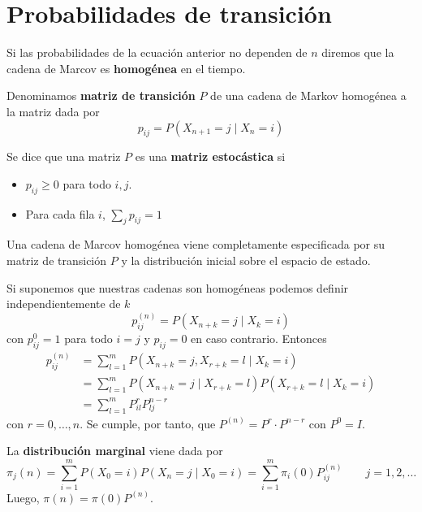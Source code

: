 \documentclass[PREyA.tex]{subfiles}
\begin{document}
\section{Probabilidades de transición}
\begin{defi}
Si las probabilidades de la ecuación anterior no dependen de $n$ diremos que la cadena de Marcov es \textbf{homogénea} en el tiempo.
\end{defi}
\begin{defi}
Denominamos \textbf{matriz de transición} $P$ de una cadena de Markov homogénea a la matriz dada por
$$
p_{ij} = P(X_{n+1}=j\mid X_{n}=i) 
$$
\end{defi}
\begin{defi}
Se dice que una matriz $P$ es una \textbf{matriz estocástica} si
	
	\begin{itemize}
		\item $p_{ij} \geq 0$ para todo $i,j$.
		\item Para cada fila $i$, $\sum_{j} p_{ij} =1$
	\end{itemize}
	
\end{defi}
\begin{prop}
Una cadena de Marcov homogénea viene completamente especificada por su matriz de transición $P$ y la distribución inicial sobre el espacio de estado.
\end{prop}
\begin{nota}
Si suponemos que nuestras cadenas son homogéneas podemos definir independientemente de $k$
$$p_{ij}^{(n)} = P(X_{n+k}=j\mid X_{k}=i)$$
 con $p_{ij}^{0}=1$ para todo $i = j$ y $p_{ij}=0$ en caso contrario. Entonces
\begin{align*}
p_{ij}^{(n)} &= \sum_{l=1}^{m}P(X_{n+k}=j, X_{r+k}=l\mid X_{k}=i)\\
&= \sum_{l=1}^{m} P(X_{n+k}=j\mid X_{r+k}=l)P(X_{r+k}=l\mid X_{k}=i)\\
&= \sum_{l=1}^{m}P_{il}^{r} P_{lj}^{n-r}
\end{align*}
con $r=0,\dotsc,n$. Se cumple, por tanto, que ${P}^{(n)} = {P}^{r} \cdot {P}^{n-r}$ con ${P}^{0}=I$.

\end{nota}
\begin{defi}
La \textbf{distribución marginal} viene dada por 
\begin{equation*}
\pi_{j}(n) = \sum_{i=1}^{m} P(X_{0}=i)P(X_{n}=j\mid X_{0}=i)=\sum_{i=1}^{m} \pi_{i}(0) P_{ij}^{(n)} \qquad  j=1,2,\dotsc 
\end{equation*}
Luego, $\pi(n)=\pi(0) P^{(n)}$.
\end{defi}
\end{document}
